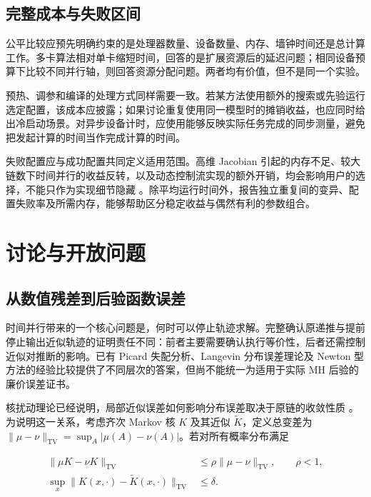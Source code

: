 \documentclass[UTF8,a4paper,zihao=-4,fontset=fandol]{ctexart}
\begin{document}
\subsection{完整成本与失败区间}

公平比较应预先明确约束的是处理器数量、设备数量、内存、墙钟时间还是总计算工作。多卡算法相对单卡缩短时间，回答的是扩展资源后的延迟问题；相同设备预算下比较不同并行轴，则回答资源分配问题。两者均有价值，但不是同一个实验。

预热、调参和编译的处理方式同样需要一致。若某方法使用额外的搜索或先验运行选定配置，该成本应披露；如果讨论重复使用同一模型时的摊销收益，也应同时给出冷启动场景。对异步设备计时，应使用能够反映实际任务完成的同步测量，避免把发起计算的时间当作完成计算的时间。

失败配置应与成功配置共同定义适用范围。高维 Jacobian 引起的内存不足、较大链数下时间并行的收益反转，以及动态控制流实现的额外开销，均会影响用户的选择，不能只作为实现细节隐藏 \cite{zoltowski2025,dance2025}。除平均运行时间外，报告独立重复间的变异、配置失败率及所需内存，能够帮助区分稳定收益与偶然有利的参数组合。

\section{讨论与开放问题}

\subsection{从数值残差到后验函数误差}

时间并行带来的一个核心问题是，何时可以停止轨迹求解。完整确认原递推与提前停止输出近似轨迹的证明责任不同：前者主要需要确认执行等价性，后者还需控制近似对推断的影响。已有 Picard 失配分析、Langevin 分布误差理论及 Newton 型方法的经验比较提供了不同层次的答案，但尚不能统一为适用于实际 MH 后验的廉价误差证书。

核扰动理论已经说明，局部近似误差如何影响分布误差取决于原链的收敛性质 \cite{mitrophanov2005,alquier2016}。为说明这一关系，考虑齐次 Markov 核 $K$ 及其近似 $\widetilde K$，定义总变差为 $\|\mu-\nu\|_{\mathrm{TV}}=\sup_A|\mu(A)-\nu(A)|$。若对所有概率分布满足

\begin{equation}
\begin{aligned}
\|\mu K-\nu K\|_{\mathrm{TV}}&\leq\rho\|\mu-\nu\|_{\mathrm{TV}},\qquad \rho<1,\\
\sup_x\|K(x,\cdot)-\widetilde K(x,\cdot)\|_{\mathrm{TV}}&\leq\delta.
\end{aligned}
\label{eq:11}
\end{equation}
\end{document}
